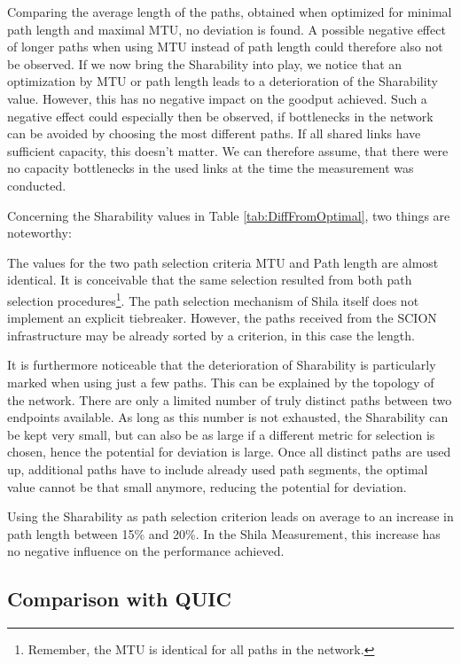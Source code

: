 Comparing the average length of the paths, obtained when optimized for minimal path length and maximal MTU, no deviation is found. A possible negative effect of longer paths when using MTU instead of path length could therefore also not be observed. If we now bring the Sharability into play, we notice that an optimization by MTU or path length leads to a deterioration of the Sharability value. However, this has no negative impact on the goodput achieved. Such a negative effect could especially then be observed,  if bottlenecks in the network can be avoided by choosing the most different paths. If all shared links have sufficient capacity, this doesn't matter. We can therefore assume, that there were no capacity bottlenecks in the used links at the time the measurement was conducted. 

Concerning the Sharability values in Table \ref{tab:DiffFromOptimal}, two things are noteworthy:

The values for the two path selection criteria MTU and Path length are almost identical. It is conceivable that the same selection resulted from both path selection procedures\footnote{Remember, the MTU is identical for all paths in the network.}. The path selection mechanism of Shila itself does not implement an explicit tiebreaker. However, the paths received from the SCION infrastructure may be already sorted by a criterion, in this case the length.

It is furthermore noticeable that the deterioration of Sharability is particularly marked when using just a few paths. This can be explained by the topology of the network. There are only a limited number of truly distinct paths between two endpoints available. As long as this number is not exhausted, the Sharability can be kept very small, but can also be as large if a different metric for selection is chosen, hence the potential for deviation is large. Once all distinct paths are used up, additional paths have to include already used path segments, the optimal value cannot be that small anymore, reducing the potential for deviation.

Using the Sharability as path selection criterion leads on average to an increase in path length between 15\% and 20\%. In the Shila Measurement, this increase has no negative influence on the performance achieved. 

\subsection*{Comparison with QUIC}
\label{subsec:ComparisonWithQUIC}

